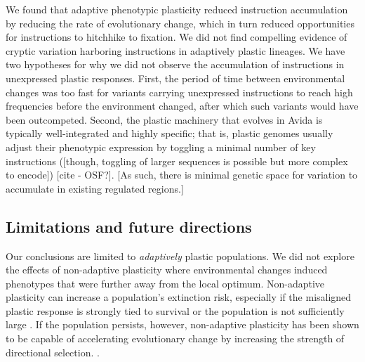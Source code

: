 We found that adaptive phenotypic plasticity reduced  instruction accumulation by reducing the rate of evolutionary change, which in turn reduced opportunities for  instructions to hitchhike to fixation.
We did not find compelling evidence of cryptic variation harboring  instructions in adaptively plastic lineages.
We have two hypotheses for why we did not observe the accumulation of  instructions in unexpressed plastic responses.
First, the period of time between environmental changes was too fast for variants carrying unexpressed  instructions to reach high frequencies before the environment changed, after which such variants would have been outcompeted.
Second, the plastic machinery that evolves in Avida is typically well-integrated and highly specific; that is, plastic genomes usually adjust their phenotypic expression by toggling a minimal number of key instructions ([though, toggling of larger sequences is possible but more complex to encode]) [cite - OSF?].
[As such, there is minimal genetic space for variation to accumulate in existing regulated regions.]



\vspace{0.25cm}
\subsection{Limitations and future directions}

Our conclusions are limited to \textit{adaptively} plastic populations.
We did not explore the effects of non-adaptive plasticity where environmental changes induced phenotypes that were further away from the local optimum.
Non-adaptive plasticity can increase a population's extinction risk, especially if the misaligned plastic response is strongly tied to survival or the population is not sufficiently large \citep{gomulkiewicz_when_1995,chevin_adaptation_2010}.
If the population persists, however, non-adaptive plasticity has been shown to be capable of accelerating evolutionary change by increasing the strength of directional selection. \citep{ghalambor_non-adaptive_2015}.

